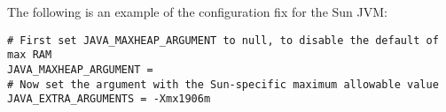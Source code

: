 The following is an example of the configuration fix for the Sun JVM:

\footnotesize
\begin{verbatim}
# First set JAVA_MAXHEAP_ARGUMENT to null, to disable the default of max RAM
JAVA_MAXHEAP_ARGUMENT =
# Now set the argument with the Sun-specific maximum allowable value
JAVA_EXTRA_ARGUMENTS = -Xmx1906m
\end{verbatim}
\normalsize


